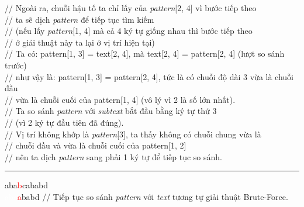 \documentclass[a4paper,11pt]{article}
\begin{document}
\begin{enumerate}
																							\hspace*{2.9cm} // Ngoài ra, chuỗi hậu tố ta chỉ lấy của \textit{pattern}[2, 4] vì bước tiếp theo \\
																							\hspace*{2.9cm} // ta sẽ dịch \textit{pattern} để tiếp tục tìm kiếm\\
																							\hspace*{2.9cm} // (nếu lấy \textit{pattern}[1, 4] mà cả 4 ký tự giống nhau thì bước tiếp theo  \\
																							\hspace*{2.9cm} // ở giải thuật này ta lại ở vị trí hiện tại) \\
																							\hspace*{2.9cm} // Ta có: pattern[1, 3] = text[2, 4], mà text[2, 4] = pattern[2, 4] (lượt so sánh trước) \\
																							\hspace*{2.9cm} // như vậy là: pattern[1, 3] = pattern[2, 4], tức là có chuỗi độ dài 3 vừa là chuỗi đầu \\
																							\hspace*{2.9cm} // vừa là chuỗi cuối của pattern[1, 4] (vô lý vì 2 là số lớn nhất).\\
																							\hspace*{2.9cm} // Ta so sánh \textit{pattern} với \textit{subtext} bắt đầu bằng ký tự thứ 3 \\
																							\hspace*{2.9cm} // (vì 2 ký tự đầu tiên đã đúng). \\
																							\hspace*{2.9cm} // Vị trí không khớp là \textit{pattern}[3],  ta thấy không có chuỗi chung vừa là \\
																							\hspace*{2.9cm} // chuỗi đầu và vừa là chuỗi cuối của pattern[1, 2]\\
																							\hspace*{2.9cm} // nên ta dịch \textit{pattern} sang phải 1 ký tự để tiếp tục so sánh.

			\vspace*{2mm}
			\hrule
			aba\textcolor{red}{b}cababd\\
			\textcolor{white}{aba}\textcolor{red}{a}babd 						\hspace*{1.2cm} // Tiếp tục so sánh \textit{pattern} với \textit{text} tương tự giải thuật Brute-Force. 


\end{enumerate}
\end{document}
